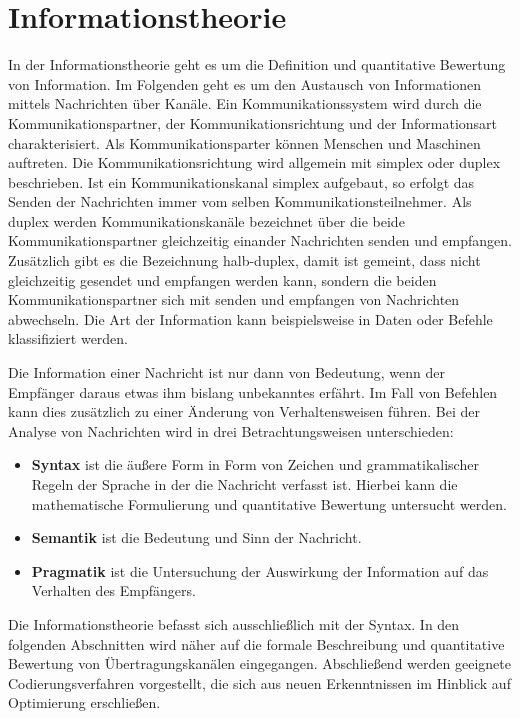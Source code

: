 \chapter{Informationstheorie}
In der Informationstheorie geht es um die Definition und quantitative Bewertung von Information. Im Folgenden geht es um den Austausch von Informationen mittels Nachrichten über Kanäle. Ein Kommunikationssystem wird durch die Kommunikationspartner, der Kommunikationsrichtung und der Informationsart charakterisiert. Als Kommunikationsparter können Menschen und Maschinen auftreten.     Die Kommunikationsrichtung wird allgemein mit simplex oder duplex beschrieben. Ist ein Kommunikationskanal simplex aufgebaut, so erfolgt das Senden der Nachrichten immer vom selben Kommunikationsteilnehmer. Als duplex werden Kommunikationskanäle bezeichnet über die beide Kommunikationspartner gleichzeitig einander Nachrichten senden und empfangen. Zusätzlich gibt es die Bezeichnung halb-duplex, damit ist gemeint, dass nicht gleichzeitig gesendet und empfangen werden kann, sondern die beiden Kommunikationspartner sich mit senden und empfangen von Nachrichten abwechseln. Die Art der Information kann beispielsweise in Daten oder Befehle klassifiziert werden.

Die Information einer Nachricht ist nur dann von Bedeutung, wenn der Empfänger daraus etwas ihm bislang unbekanntes erfährt. Im Fall von Befehlen kann dies zusätzlich zu einer Änderung von Verhaltensweisen führen. Bei der Analyse von Nachrichten wird in drei Betrachtungsweisen unterschieden:
\begin{itemize}
  \item \textbf{Syntax} ist die äußere Form in Form von Zeichen und grammatikalischer Regeln der Sprache in der die Nachricht verfasst ist. Hierbei kann die mathematische Formulierung und quantitative Bewertung untersucht werden.
  \item \textbf{Semantik} ist die Bedeutung und Sinn der Nachricht.
  \item \textbf{Pragmatik} ist die Untersuchung der Auswirkung der Information auf das Verhalten des Empfängers.
\end{itemize}

Die Informationstheorie befasst sich ausschließlich mit der Syntax. In den folgenden Abschnitten wird näher auf die formale Beschreibung und quantitative Bewertung von Übertragungskanälen eingegangen. Abschließend werden geeignete Codierungsverfahren vorgestellt, die sich aus neuen Erkenntnissen im Hinblick auf Optimierung erschließen.

